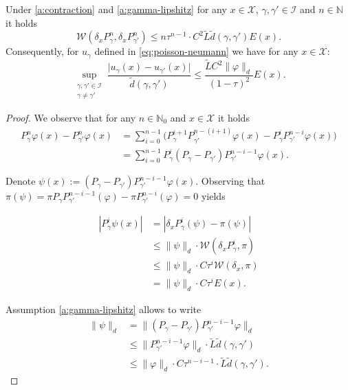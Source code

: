 \begin{lemma}
    Under \ref{a:contraction} and \ref{a:gamma-lipshitz} for any $x \in \mathcal{X}$, $\gamma, \gamma' \in \mathcal{I}$ and $n \in \mathbb{N}$ it holds
\[
    \mathcal{W}(\delta_xP_{\gamma}^n, \delta_xP_{\gamma'}^n) \leq n\tau^{n-1} \cdot C^2 \tilde{L}  \tilde{d}(\gamma, \gamma') E(x).
\]
    Consequently, for $u_\gamma$ defined in \eqref{eq:poisson-neumann} we have for any $x \in \mathcal{X}$:
\[
  \sup_{\substack{\gamma, \gamma' \in \mathcal{I} \\ \gamma \neq \gamma'}}\frac{\lvert u_\gamma(x) - u_{\gamma'}(x) \rvert}{\tilde{d}(\gamma, \gamma')} \leq \frac{\tilde{L} C^2 \| \varphi \|_d}{(1-\tau)^2} E(x).
\] 


\begin{proof}

    We observe that for any $n \in \mathbb{N}_0$ and $x \in \mathcal{X}$ it holds
    \begin{align*}
    P_{\gamma}^n\varphi(x)-P_{\gamma'}^n\varphi(x)
    &=\sum_{i=0}^{n-1} \big(P_{\gamma}^{i+1}P_{\gamma'}^{n-(i+1)}\varphi(x)-P_{\gamma}^{i}P_{\gamma'}^{n-i}\varphi(x)\big)  \\
    &=\sum_{i=0}^{n-1} P_{\gamma}^{i}(P_{\gamma}-P_{\gamma'})P_{\gamma'}^{n-i-1}\varphi(x).
    \end{align*}

    Denote $\psi(x) := (P_{\gamma}-P_{\gamma'})P_{\gamma'}^{n-i-1} \varphi(x)$.
    Observing that $\pi(\psi) = \pi P_{\gamma}P_{\gamma'}^{n-i-1}(\varphi) - \pi P_{\gamma'}^{n-i}(\varphi) = 0$ yields

    \begin{align*}
        \left\vert P_{\gamma}^{i}\psi(x) \right\vert 
        &= \left\vert \delta_x P_{\gamma}^{i}(\psi) - \pi(\psi) \right\vert \\
        &\leq \| \psi \|_d \cdot \mathcal{W}(\delta_x P_{\gamma}^i, \pi) \\
        &\leq \| \psi \|_d \cdot C\tau^i \mathcal{W}(\delta_x, \pi) \\
        &= \| \psi \|_d \cdot C\tau^i E(x).
    \end{align*}
    
    Assumption \ref{a:gamma-lipshitz} allows to write
    \begin{align*}
        \| \psi \|_d 
        &= \| (P_{\gamma}-P_{\gamma'})P_{\gamma'}^{n-i-1} \varphi \|_d \\
        &\leq \| P_{\gamma'}^{n-i-1} \varphi \|_d \cdot \tilde{L}\tilde{d}(\gamma, \gamma') \\
        &\leq \| \varphi \|_d \cdot C\tau^{n-i-1} \cdot \tilde{L}\tilde{d}(\gamma, \gamma').
    \end{align*}


\end{proof}
\end{lemma}
